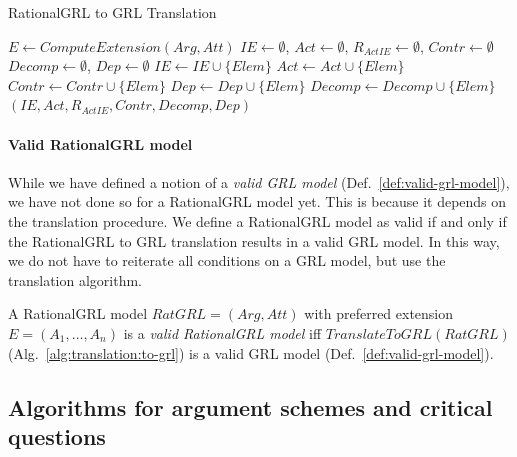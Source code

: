 \begin{algorithm}[h]
  \caption{RationalGRL to GRL Translation}
  \label{alg:translation:to-grl}
  \begin{algorithmic}[1]
    \State $E \leftarrow ComputeExtension(Arg,Att)$
    \State $IE\leftarrow\emptyset$, $Act\leftarrow\emptyset$, $R_{ActIE}\leftarrow\emptyset$, $Contr\leftarrow\emptyset$
    \State $Decomp\leftarrow\emptyset$, $Dep\leftarrow\emptyset$
    \label{alg:translation:to-grl:extension-iter}
      \label{alg:translation:to-grl:switch}
            \State $IE\leftarrow IE\cup \{Elem\}$
          \EndCase
            \State $Act\leftarrow Act \cup\{Elem\}$
          \EndCase
            \State $Contr\leftarrow Contr\cup \{Elem\}$
          \EndCase
            \State $Dep\leftarrow Dep\cup \{Elem\}$
          \EndCase
            \State $Decomp\leftarrow Decomp\cup\{Elem\}$
          \EndCase
      \EndSwitch
    \EndFor
    \State \Return $(IE,Act,R_{ActIE}, Contr, Decomp, Dep)$\label{alg:translation:to-grl:return}
    \EndProcedure
  \end{algorithmic}
\end{algorithm}

\paragraph{Valid RationalGRL model} While we have defined a notion of a \emph{valid GRL model} (Def.~\ref{def:valid-grl-model}), we have not done so for a RationalGRL model yet. This is because it depends on the translation procedure. We define a RationalGRL model as valid if and only if the RationalGRL to GRL translation results in a valid GRL model. In this way, we do not have to reiterate all conditions on a GRL model, but use the translation algorithm.

\begin{definition}
\label{def:valid-rationalgrl-model}
A RationalGRL model $RatGRL = (Arg, Att)$ with preferred extension $E=(A_1,\ldots,A_n)$ is a \emph{valid RationalGRL model} iff $TranslateToGRL(RatGRL)$ (Alg.~\ref{alg:translation:to-grl}) is a valid GRL model (Def.~\ref{def:valid-grl-model}).
\end{definition}

\subsection{Algorithms for argument schemes and critical questions}
\label{sect:algorithms}

